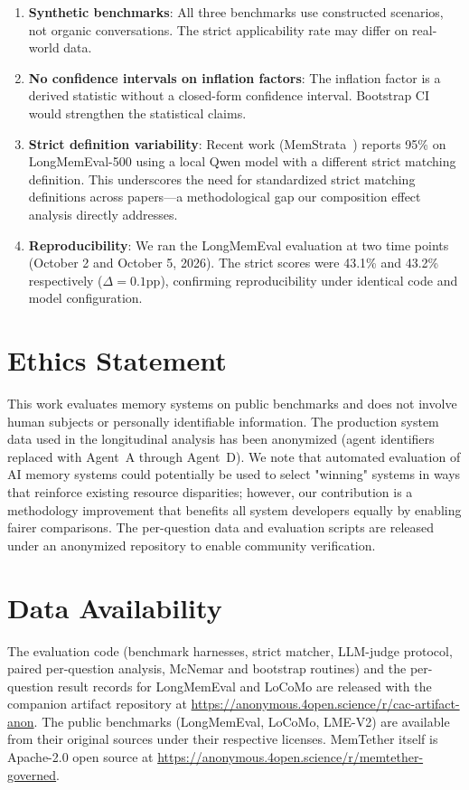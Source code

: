 \documentclass[10pt]{article}
\begin{document}
\begin{enumerate}
\item \textbf{Synthetic benchmarks}: All three benchmarks use constructed scenarios, not organic conversations. The strict applicability rate may differ on real-world data.
\item \textbf{No confidence intervals on inflation factors}: The inflation factor is a derived statistic without a closed-form confidence interval. Bootstrap CI would strengthen the statistical claims.
\item \textbf{Strict definition variability}: Recent work (MemStrata~\citep{memstrata2026}) reports 95\% on LongMemEval-500 using a local Qwen model with a different strict matching definition. This underscores the need for standardized strict matching definitions across papers—a methodological gap our composition effect analysis directly addresses.
\item \textbf{Reproducibility}: We ran the LongMemEval evaluation at two time points (October 2 and October 5, 2026). The strict scores were 43.1\% and 43.2\% respectively ($\Delta = 0.1$pp), confirming reproducibility under identical code and model configuration.\end{enumerate}

\section{Ethics Statement}
This work evaluates memory systems on public benchmarks and does not involve human subjects or personally identifiable information. The production system data used in the longitudinal analysis has been anonymized (agent identifiers replaced with Agent~A through Agent~D). We note that automated evaluation of AI memory systems could potentially be used to select "winning" systems in ways that reinforce existing resource disparities; however, our contribution is a methodology improvement that benefits all system developers equally by enabling fairer comparisons. The per-question data and evaluation scripts are released under an anonymized repository to enable community verification.
\section*{Data Availability}
The evaluation code (benchmark harnesses, strict matcher, LLM-judge protocol, paired
per-question analysis, McNemar and bootstrap routines) and the per-question result
records for LongMemEval and LoCoMo are released with the companion artifact repository
at \url{https://anonymous.4open.science/r/cac-artifact-anon}. The public benchmarks
(LongMemEval, LoCoMo, LME-V2) are available from their original sources under their
respective licenses. MemTether itself is Apache-2.0 open source at
\url{https://anonymous.4open.science/r/memtether-governed}.
\end{document}
